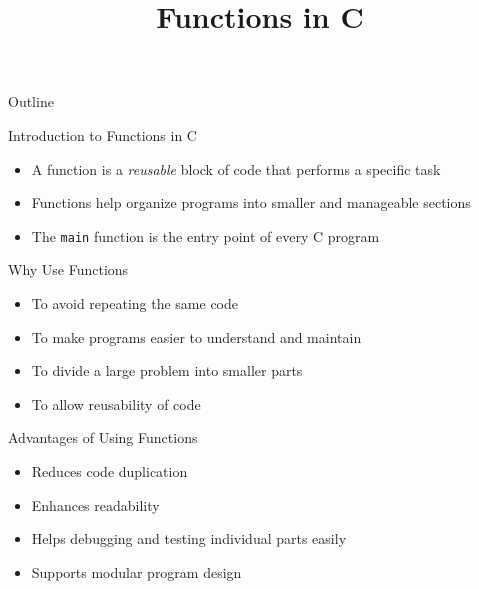 \documentclass[12pt, aspectratio=169]{beamer}
\title{Functions in C}
\author{}
\date{}
\begin{document}
    {
		\addtocounter{framenumber}{-2}    %

		\begin{frame}
			\titlepage
		\end{frame}

		\begin{frame}{Outline}
            \small
			\tableofcontents[subsectionstyle=hide]
		\end{frame}
	}

    \begin{frame}{Introduction to Functions in C}
    \begin{itemize}
        \item A function is a \emph{reusable} block of code that performs a specific task
        \item Functions help organize programs into smaller and manageable sections
        \item The \texttt{main} function is the entry point of every C program
    \end{itemize}
    \end{frame}


    \begin{frame}{Why Use Functions}
    \begin{itemize}
        \item To avoid repeating the same code
        \item To make programs easier to understand and maintain
        \item To divide a large problem into smaller parts
        \item To allow reusability of code
    \end{itemize}
    \end{frame}


    \begin{frame}{Advantages of Using Functions}
    \begin{itemize}
        \item Reduces code duplication
        \item Enhances readability
        \item Helps debugging and testing individual parts easily
        \item Supports modular program design
    \end{itemize}
    \end{frame}
\end{document}
